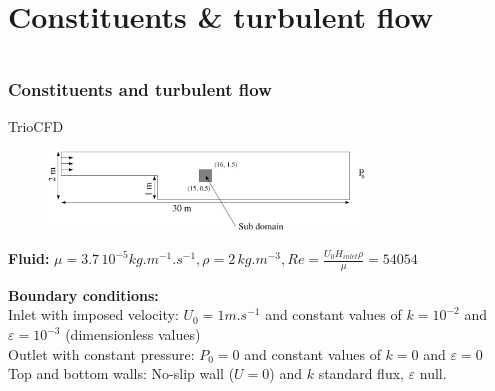\documentclass[10pt, hyperref={unicode=true,pdfusetitle, bookmarks=true,bookmarksnumbered=false,bookmarksopen=false, breaklinks=false,pdfborder={0 0 1},backref=true,colorlinks=true,linkcolor=darkblue,pageanchor}]{beamer}
\begin{document}


\section{{\bf{Constituents \& turbulent flow}}}
\begin{frame}
\begin{small}
\begin{columns}[c] 
\tableofcontents[sections={1-9},currentsection, currentsubsection]
\tableofcontents[sections={10-16},currentsection, currentsubsection]
\end{columns}
\end{small}
\end{frame}
\begin{frame}
\frametitle{Constituents and turbulent flow}
\begin{block}{TrioCFD}

\begin{figure}
\includegraphics[width=0.75\textwidth]{PICTURES/marche.pdf}
\end{figure}

\textbf{Fluid:} $\mu=3.7 \, 10^{-5} kg.m^{-1}.s^{-1}, \rho=2 \, kg.m^{-3}, Re=\frac{U_0 H_{inlet} \rho}{\mu} =54054$

\textbf{Boundary conditions:} \\
Inlet with imposed velocity: $U_0=1 m.s^{-1}$ and constant values of $k=10^{-2}$ and $\varepsilon=10^{-3}$ (dimensionless values)\\
Outlet with constant pressure: $P_0=0$ and constant values of $k=0$ and $\varepsilon=0$ \\
Top and bottom walls: No-slip wall ($U=0$) and $k$ standard flux, $\varepsilon$ null.

\end{block}
\end{frame}
\end{document}
